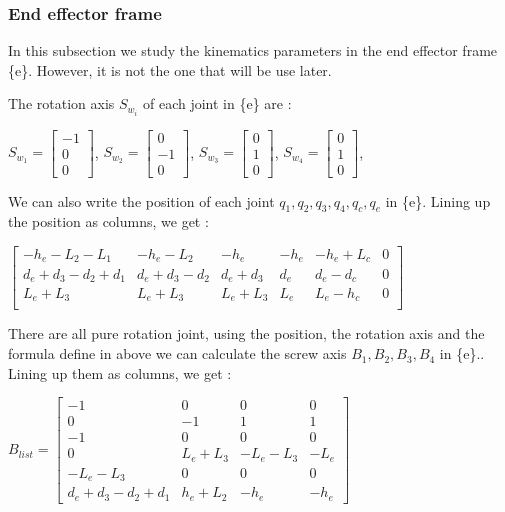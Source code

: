 \subsubsection{End effector frame}

In this subsection we study the kinematics parameters in the end effector frame \{e\}. However, it is not the one that will be use later. 

\bigbreak
The rotation axis $S_{w_i}$ of each joint  in \{e\} are : 
\begin{center}
    $S_{w_1} = \begin{bmatrix} -1 \\ 0 \\ 0\end{bmatrix}$,
    $S_{w_2} = \begin{bmatrix} 0 \\ -1 \\ 0\end{bmatrix}$,
    $S_{w_3} = \begin{bmatrix} 0 \\ 1 \\ 0\end{bmatrix}$,
    $S_{w_4} = \begin{bmatrix} 0 \\ 1 \\ 0\end{bmatrix}$,
\end{center}

\bigbreak
We can also write the position of each joint  $q_1,q_2,q_3,q_4,q_c,q_e$ in \{e\}. Lining up the position as columns, we get : 

\begin{center}
    $
    \begin{bmatrix}
        -h_e-L_2-L_1 & -h_e-L_2 & -h_e & -h_e & -h_e+L_c & 0  \\
        d_e+d_3-d_2+d_1 & d_e+d_3-d_2 & d_e+d_3 & d_e & d_e-d_c & 0 \\
        L_e+L_3 & L_e+L_3 & L_e+L_3 & L_e & L_e-h_c & 0 \\
    \end{bmatrix}
    $
\end{center}

\bigbreak
There are all pure rotation joint, using the position, the rotation axis and the formula define in above we can calculate the screw axis $B_1,B_2,B_3,B_4$ in \{e\}.. Lining up them as columns, we get : 

\begin{center}
    $B_{list} = 
    \begin{bmatrix}
        -1 & 0 & 0 & 0 \\
        0 & -1 & 1 & 1 \\
        -1 & 0 & 0 & 0 \\
        0 & L_e+L_3 & -L_e-L_3 & -L_e \\
        -L_e-L_3 & 0 & 0 & 0 \\
        d_e+d_3-d_2+d_1 & h_e+L_2 & -h_e & -h_e
    \end{bmatrix}
    $
\end{center}

